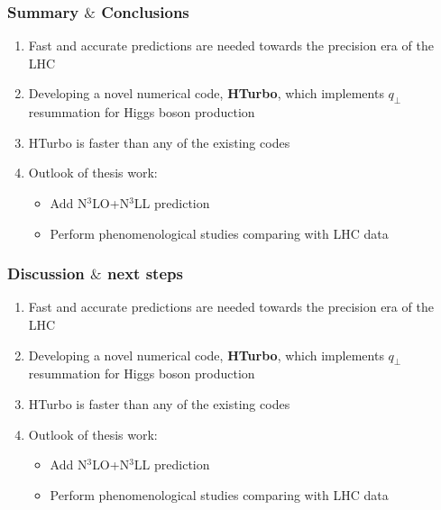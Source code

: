 \documentclass[aspectratio=43]{beamer}
\begin{document}
\begin{frame}
	
	\frametitle{Summary $\&$ Conclusions}
	
	\vspace{2.0 cm}
	
	\begin{enumerate}
		\item Fast and accurate predictions are needed towards the precision era of the LHC
		\item Developing a novel numerical code, \textbf{HTurbo}, which implements $q_{\perp}$ resummation for Higgs boson production
		\item HTurbo is {\color{blue} faster than any of the existing codes}
		\item Outlook of thesis work: 
		\begin{itemize}
			\item Add {\color{blue}N$^{3}$LO+N$^{3}$LL} prediction
			\item Perform phenomenological studies comparing with LHC data
		\end{itemize}
	
\end{enumerate}

\vspace{2.0 cm}

\end{frame}

\begin{frame}
	
	\frametitle{Discussion $\&$ next steps}

	\vspace{2.0 cm}
	
	\begin{enumerate}
		\item Fast and accurate predictions are needed towards the precision era of the LHC
		\item Developing a novel numerical code, \textbf{HTurbo}, which implements $q_{\perp}$ resummation for Higgs boson production
		\item HTurbo is {\color{blue} faster than any of the existing codes}
		\item Outlook of thesis work: 
		\begin{itemize}
			\item Add {\color{blue}N$^{3}$LO+N$^{3}$LL} prediction
			\item Perform phenomenological studies comparing with LHC data
		\end{itemize}

	\end{enumerate}

	\vspace{2.0 cm}

\end{frame}
\end{document}
